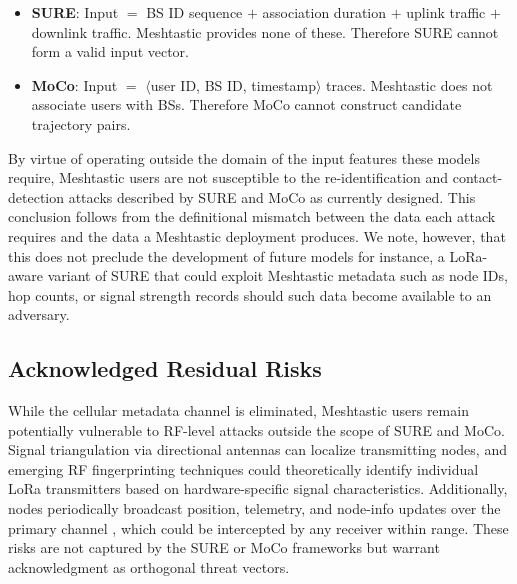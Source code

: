 \begin{itemize}
    \item \textbf{SURE}: Input $=$ BS ID sequence $+$ association duration $+$ uplink traffic $+$ downlink traffic. Meshtastic provides none of these. Therefore SURE cannot form a valid input vector.
    \item \textbf{MoCo}: Input $=$ $\langle$user ID, BS ID, timestamp$\rangle$ traces. Meshtastic does not associate users with BSs. Therefore MoCo cannot construct candidate trajectory pairs.
\end{itemize}

By virtue of operating outside the domain of the input features these models require, Meshtastic users are not susceptible to the re-identification and contact-detection attacks described by SURE and MoCo as currently designed. This conclusion follows from the definitional mismatch between the data each attack requires and the data a Meshtastic deployment produces. We note, however, that this does not preclude the development of future models for instance, a LoRa-aware variant of SURE that could exploit Meshtastic metadata such as node IDs, hop counts, or signal strength records should such data become available to an adversary.

\subsection{Acknowledged Residual Risks}
While the cellular metadata channel is eliminated, Meshtastic users remain potentially vulnerable to RF-level attacks outside the scope of SURE and MoCo. Signal triangulation via directional antennas can localize transmitting nodes, and emerging RF fingerprinting techniques could theoretically identify individual LoRa transmitters based on hardware-specific signal characteristics. Additionally, nodes periodically broadcast position, telemetry, and node-info updates over the primary channel \cite{meshtastic_overview}, which could be intercepted by any receiver within range. These risks are not captured by the SURE or MoCo frameworks but warrant acknowledgment as orthogonal threat vectors.

